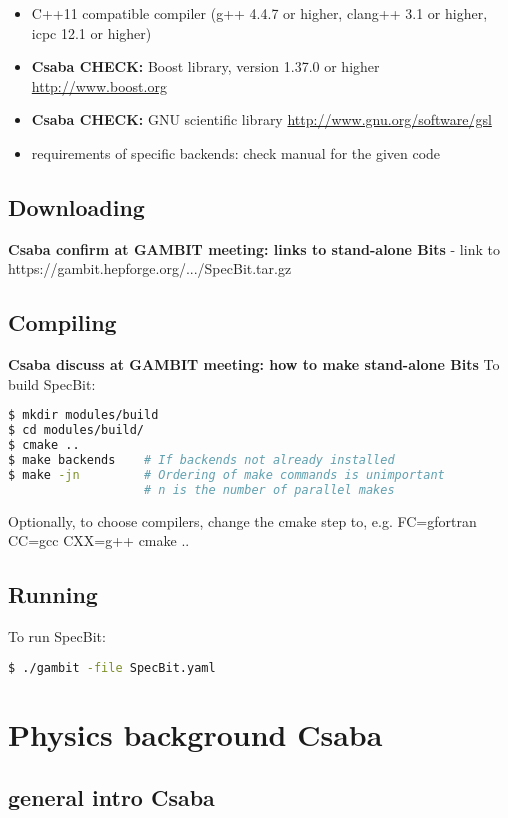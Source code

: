 \documentclass[11pt,a4paper]{article}
\newcommand{\Csaba}[1]{{\bf\color{orange}Csaba #1}}
\begin{document}
\begin{itemize}
\item C++11 compatible compiler (g++ 4.4.7 or higher, clang++ 3.1 or higher, icpc 12.1 or higher)
\item \Csaba{CHECK:} Boost library, version 1.37.0 or higher
\url{http://www.boost.org}
\item \Csaba{CHECK:} GNU scientific library \url{http://www.gnu.org/software/gsl}
\item requirements of specific backends: check manual for the given code
\end{itemize}

\subsection*{Downloading}

\Csaba{confirm at GAMBIT meeting: links to stand-alone Bits}
- link to https://gambit.hepforge.org/.../SpecBit.tar.gz 

\subsection*{Compiling}

\Csaba{discuss at GAMBIT meeting: how to make stand-alone Bits}
To build SpecBit:
\begin{lstlisting}[language=bash]
$ mkdir modules/build
$ cd modules/build/
$ cmake ..
$ make backends    # If backends not already installed
$ make -jn         # Ordering of make commands is unimportant
                   # n is the number of parallel makes
\end{lstlisting}

Optionally, to choose compilers, change the cmake step to, e.g. FC=gfortran CC=gcc CXX=g++ cmake ..

\subsection*{Running}

To run SpecBit:
\begin{lstlisting}[language=bash]
$ ./gambit -file SpecBit.yaml
\end{lstlisting}


\section{Physics background \Csaba{}}


\subsection{general intro \Csaba{}}
\end{document}
